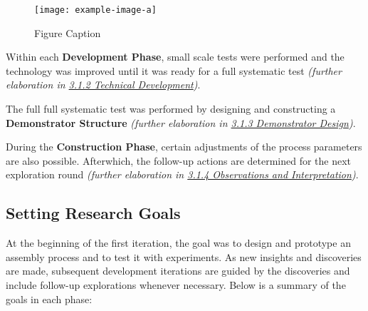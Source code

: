 \begin{figure}
    \centering
    \texttt{[image: example-image-a]}
    \caption{Figure Caption}
\end{figure}

Within each \textbf{Development Phase}, small scale tests were performed and the technology was improved until it was ready for a full systematic test \textit{(further elaboration in \ul{3.1.2 Technical Development})}. 

The full full systematic test was performed by designing and constructing a \textbf{Demonstrator Structure} \textit{(further elaboration in \ul{3.1.3 Demonstrator Design})}. 

During the \textbf{Construction Phase}, certain adjustments of the process parameters are also possible. Afterwhich, the follow-up actions are determined for the next exploration round\textbf{ }\textit{(further elaboration in \ul{3.1.4 Observations and Interpretation})}.

\subsection{Setting Research Goals}
\label{subsection:methodology_setting_research_goals}

At the beginning of the first iteration, the goal was to design and prototype an assembly process and to test it with experiments. As new insights and discoveries are made, subsequent development iterations are guided by the discoveries and include follow-up explorations whenever necessary. Below is a summary of the goals in each phase:


